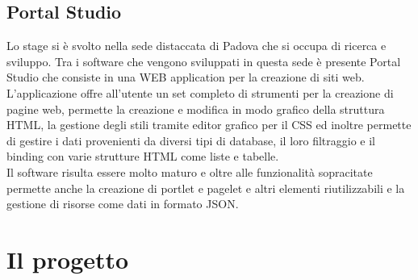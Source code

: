 \subsection{Portal Studio}
Lo stage si è svolto nella sede distaccata di Padova che si occupa di ricerca e sviluppo.
Tra i software che vengono sviluppati in questa sede è presente Portal Studio che consiste in una WEB application per la creazione di siti web.\\
L'applicazione offre all'utente un set completo di strumenti per la creazione di pagine web, permette la creazione e modifica in modo grafico della struttura HTML, la gestione degli stili tramite editor grafico per il CSS ed inoltre permette di gestire i dati provenienti da diversi tipi di database, il loro filtraggio e il binding con varie strutture HTML come liste e tabelle.\\
Il software risulta essere molto maturo e oltre alle funzionalità sopracitate permette anche la creazione di portlet e pagelet e altri elementi riutilizzabili e la gestione di risorse come dati in formato JSON.


\section{Il progetto}
